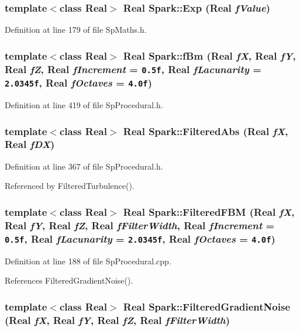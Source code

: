\subsubsection{\setlength{\rightskip}{0pt plus 5cm}template$<$class Real$>$ Real Spark::Exp (Real {\em f\-Value})}\label{namespaceSpark_a43}


Definition at line 179 of file Sp\-Maths.h.
\subsubsection{\setlength{\rightskip}{0pt plus 5cm}template$<$class Real$>$ Real Spark::f\-Bm (Real {\em f\-X}, Real {\em f\-Y}, Real {\em f\-Z}, Real {\em f\-Increment} = {\tt 0.5f}, Real {\em f\-Lacunarity} = {\tt 2.0345f}, Real {\em f\-Octaves} = {\tt 4.0f})}\label{namespaceSpark_a90}


Definition at line 419 of file Sp\-Procedural.h.
\subsubsection{\setlength{\rightskip}{0pt plus 5cm}template$<$class Real$>$ Real Spark::Filtered\-Abs (Real {\em f\-X}, Real {\em f\-DX})}\label{namespaceSpark_a106}


Definition at line 367 of file Sp\-Procedural.h.

Referenced by Filtered\-Turbulence().
\subsubsection{\setlength{\rightskip}{0pt plus 5cm}template$<$class Real$>$ Real Spark::Filtered\-FBM (Real {\em f\-X}, Real {\em f\-Y}, Real {\em f\-Z}, Real {\em f\-Filter\-Width}, Real {\em f\-Increment} = {\tt 0.5f}, Real {\em f\-Lacunarity} = {\tt 2.0345f}, Real {\em f\-Octaves} = {\tt 4.0f})}\label{namespaceSpark_a83}


Definition at line 188 of file Sp\-Procedural.cpp.

References Filtered\-Gradient\-Noise().
\subsubsection{\setlength{\rightskip}{0pt plus 5cm}template$<$class Real$>$ Real Spark::Filtered\-Gradient\-Noise (Real {\em f\-X}, Real {\em f\-Y}, Real {\em f\-Z}, Real {\em f\-Filter\-Width})}\label{namespaceSpark_a111}


